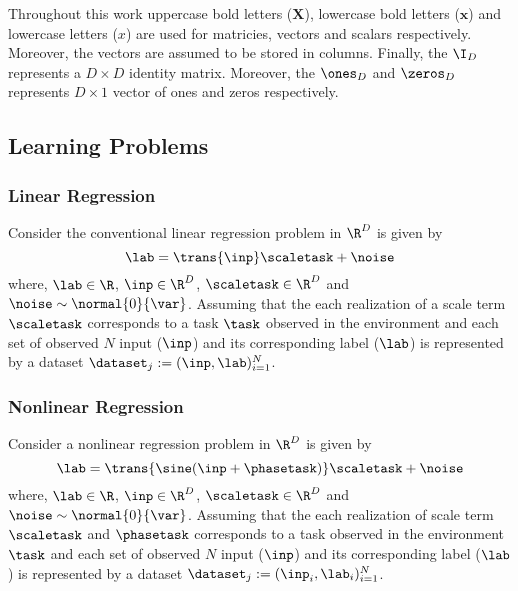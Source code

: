 Throughout this work uppercase bold letters (\eg $\mathbf{X}$), lowercase bold letters (\eg $\mathbf{x}$) and lowercase letters (\eg ${x}$) are used for matricies, vectors and scalars respectively. Moreover, the vectors are assumed to be stored in columns. Finally, the $\I_{D}$ represents a $D\times D$ identity matrix. Moreover, the $\ones_{D}$ and $\zeros_{D}$ represents $D\times 1$ vector of ones and zeros respectively.

\subsection{Learning Problems}

\subsubsection{Linear Regression}\label{sec:Linear}

Consider the conventional linear regression problem in $\R^D$ is given by
\begin{equation}\label{eq:linearreg}
  \lab = \trans{\inp}\scaletask+\noise
\end{equation}
where, $\lab\in\R$, $\inp\in\R^D$, $\scaletask\in\R^D$ and $\noise\sim\normal{0}{\var}$. Assuming that the each realization of a scale term $\scaletask$ corresponds to a task $\task$  observed in the environment and each set of observed $N$ input ($\inp$) and its corresponding label ($\lab$) is represented by a dataset $\dataset_{j}:=(\inp, \lab)_{i=1}^{N}$. 

\subsubsection{Nonlinear Regression}\label{sec:Nonlinear}

Consider a nonlinear regression problem in $\R^D$ is given by
\begin{equation}\label{eq:nonlinearreg}
  \lab = \trans{\sine(\inp+\phasetask)}\scaletask+\noise
\end{equation}
where, $\lab\in\R$, $\inp\in\R^D$, $\scaletask\in\R^D$ and $\noise\sim\normal{0}{\var}$. Assuming that the each realization of scale term $\scaletask$ and $\phasetask$ corresponds to a task observed in the environment $\task$ and each set of observed $N$ input ($\inp$) and its corresponding label ($\lab$) is represented by a dataset $\dataset_{j}:=(\inp_i, \lab_i)_{i=1}^{N}$.


